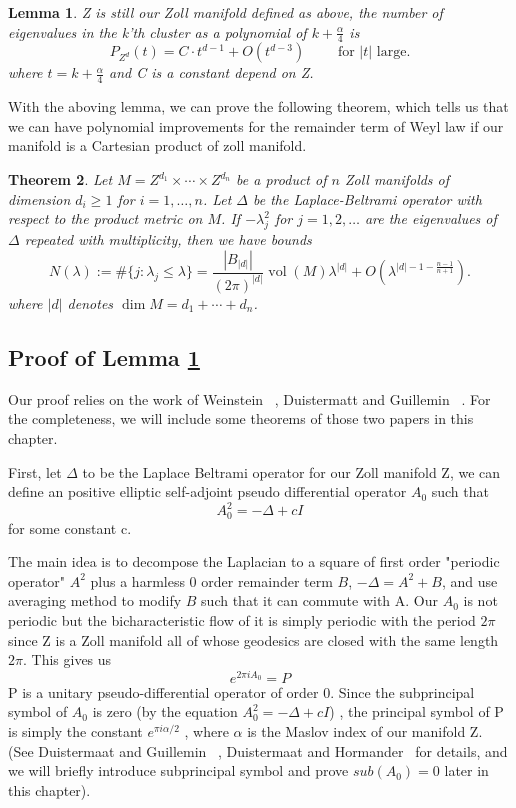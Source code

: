 \documentclass[10pt]{amsart}
\newcommand{\newsection}[1]
{\subsection{#1}\setcounter{theorem}{0} \setcounter{equation}{0}
\par\noindent}
\newtheorem{theorem}{Theorem}
\newtheorem{lemma}[theorem]{Lemma}
\newcommand{\1}{\mathbb{1}}
\newcommand{\vol}{\operatorname{vol}}
\begin{document}
\begin{lemma}\label{zec}
    Z is still our Zoll manifold defined as above, the number of eigenvalues in the k'th cluster as a polynomial of $k+\frac{\alpha}{4}$ is 
    \begin{equation} \label{zolclu}
    P_{Z^d}(t) = C \cdot t^{d-1} + O(t^{d-3}) \qquad \text{ for $|t|$ large.}
    \end{equation}
    where $t=k + \frac{\alpha}{4}$ and C is a constant depend on Z.
\end{lemma}

With the aboving lemma, we can prove the following theorem, which tells us that we can have polynomial improvements for the remainder term of Weyl law if our manifold is a Cartesian product of zoll manifold.



\begin{theorem}\label{zollweyl}
    Let $M = Z^{d_1} \times \cdots \times Z^{d_n}$ be a product of $n$ Zoll manifolds of dimension $d_i \geq 1$ for $i = 1,\ldots,n$. Let $\Delta$ be the Laplace-Beltrami operator with respect to the product metric on $M$. If $-\lambda_j^2$ for $j = 1,2,\ldots$ are the eigenvalues of $\Delta$ repeated with multiplicity, then we have bounds
    \[
        N(\lambda) := \#\{ j : \lambda_j \leq \lambda \} = \frac{|B_{|d|}|}{(2\pi)^{|d|}} \vol(M) \lambda^{|d|} + O(\lambda^{|d|-1-\frac{n-1}{n+1}}).
    \]
    where $|d|$ denotes $\dim M = d_1 + \cdots + d_n$.
\end{theorem}

\newsection{Proof of Lemma \ref{zec}}

Our proof relies on the work of Weinstein ~\cite{Wein77}, Duistermatt and Guillemin ~\cite{DuistermaatGuillemin}. For the completeness, we will include some theorems of those two papers in this chapter.

First, let $\Delta$ to be the Laplace Beltrami operator for our Zoll manifold Z, we can define an positive elliptic self-adjoint pseudo differential operator $A_0$ such that 
\[
A_0^2 = -\Delta + cI
\]
for some constant c. 

The main idea is to decompose the Laplacian to a square of first order "periodic operator" $A^2$ plus a harmless 0 order remainder term $B$, $-\Delta = A^2 + B$, and use averaging method to modify $B$ such that it can commute with A. Our $A_0$ is not periodic but the bicharacteristic flow of it is simply periodic with the period $2\pi$ since Z is a Zoll manifold all of whose geodesics are closed with the same length $2\pi$. This gives us 
\[
e^{2\pi i A_0}=P
\]
P is a unitary pseudo-differential operator of order 0. Since the subprincipal symbol of $A_0$ is zero (by the equation $A_0^2 = -\Delta +cI$) , the principal symbol of P is simply the constant $e^{\pi i \alpha/2 }$ , where $\alpha$ is the Maslov index of our manifold Z. (See Duistermaat and Guillemin~\cite{DuistermaatGuillemin} , Duistermaat and Hormander~\cite{FIO2} for details, and we will briefly introduce subprincipal symbol and prove $sub(A_0) = 0 $ later in this chapter).
\end{document}
